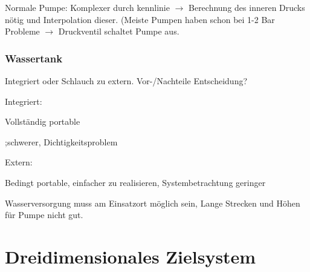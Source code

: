 Normale Pumpe: Komplexer durch kennlinie $\rightarrow$ Berechnung des
inneren Drucks nötig und Interpolation dieser. (Meiste Pumpen
haben schon bei 1-2 Bar Probleme $\rightarrow$ Druckventil schaltet Pumpe aus.

\subsubsection{Wassertank}
Integriert oder Schlauch zu extern. Vor-/Nachteile Entscheidung?

Integriert:

Vollständig portable

;schwerer, Dichtigkeitsproblem

Extern:

Bedingt portable, einfacher zu realisieren, Systembetrachtung geringer

Wasserversorgung muss am Einsatzort möglich sein, Lange Strecken und Höhen für
Pumpe nicht gut.


\section{Dreidimensionales Zielsystem}


